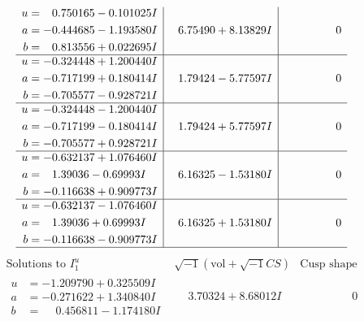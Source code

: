 \documentclass[1p]{elsarticle_modified}
\theoremstyle{definition}
\newcommand{\I}{\sqrt{-1}}
\begin{document}
$$\begin{array}{c|c|c}
\begin{aligned}
u &= \phantom{-}0.750165 - 0.101025 I \\
a &= -0.444685 - 1.193580 I \\
b &= \phantom{-}0.813556 + 0.022695 I\end{aligned}
 & \phantom{-}6.75490 + 8.13829 I & \phantom{-0.000000 } 0 \\ \hline\begin{aligned}
u &= -0.324448 + 1.200440 I \\
a &= -0.717199 + 0.180414 I \\
b &= -0.705577 - 0.928721 I\end{aligned}
 & \phantom{-}1.79424 - 5.77597 I & \phantom{-0.000000 } 0 \\ \hline\begin{aligned}
u &= -0.324448 - 1.200440 I \\
a &= -0.717199 - 0.180414 I \\
b &= -0.705577 + 0.928721 I\end{aligned}
 & \phantom{-}1.79424 + 5.77597 I & \phantom{-0.000000 } 0 \\ \hline\begin{aligned}
u &= -0.632137 + 1.076460 I \\
a &= \phantom{-}1.39036 - 0.69993 I \\
b &= -0.116638 + 0.909773 I\end{aligned}
 & \phantom{-}6.16325 - 1.53180 I & \phantom{-0.000000 } 0 \\ \hline\begin{aligned}
u &= -0.632137 - 1.076460 I \\
a &= \phantom{-}1.39036 + 0.69993 I \\
b &= -0.116638 - 0.909773 I\end{aligned}
 & \phantom{-}6.16325 + 1.53180 I & \phantom{-0.000000 } 0\\
 \hline 
 \end{array}$$\newpage$$\begin{array}{c|c|c}  
\text{Solutions to }I^u_{1}& \I (\text{vol} + \sqrt{-1}CS) & \text{Cusp shape}\\
 \hline 
\begin{aligned}
u &= -1.209790 + 0.325509 I \\
a &= -0.271622 + 1.340840 I \\
b &= \phantom{-}0.456811 - 1.174180 I\end{aligned}
 & \phantom{-}3.70324 + 8.68012 I & \phantom{-0.000000 } 0 \\ \hline\begin{aligned}

\end{aligned}
\end{array}$$
\end{document}
